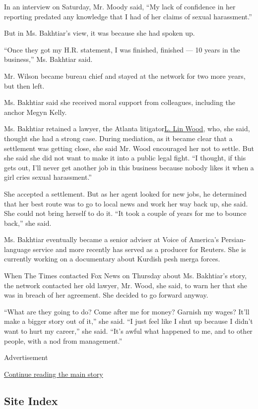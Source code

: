 In an interview on Saturday, Mr. Moody said, ``My lack of confidence in
her reporting predated any knowledge that I had of her claims of sexual
harassment.''

But in Ms. Bakhtiar's view, it was because she had spoken up.

``Once they got my H.R. statement, I was finished, finished --- 10 years
in the business,'' Ms. Bakhtiar said.

Mr. Wilson became bureau chief and stayed at the network for two more
years, but then left.

Ms. Bakhtiar said she received moral support from colleagues, including
the anchor Megyn Kelly.

Ms. Bakhtiar retained a lawyer, the Atlanta
litigator\href{http://www.linwoodlaw.com/attorney/l-lin-wood/}{L. Lin
Wood}, who, she said, thought she had a strong case. During mediation,
as it became clear that a settlement was getting close, she said Mr.
Wood encouraged her not to settle. But she said she did not want to make
it into a public legal fight. ``I thought, if this gets out, I'll never
get another job in this business because nobody likes it when a girl
cries sexual harassment.''

She accepted a settlement. But as her agent looked for new jobs, he
determined that her best route was to go to local news and work her way
back up, she said. She could not bring herself to do it. ``It took a
couple of years for me to bounce back,'' she said.

Ms. Bakhtiar eventually became a senior adviser at Voice of America's
Persian-language service and more recently has served as a producer for
Reuters. She is currently working on a documentary about Kurdish pesh
merga forces.

When The Times contacted Fox News on Thursday about Ms. Bakhtiar's
story, the network contacted her old lawyer, Mr. Wood, she said, to warn
her that she was in breach of her agreement. She decided to go forward
anyway.

``What are they going to do? Come after me for money? Garnish my wages?
It'll make a bigger story out of it,'' she said. ``I just feel like I
shut up because I didn't want to hurt my career,'' she said. ``It's
awful what happened to me, and to other people, with a nod from
management.''

Advertisement

\protect\hyperlink{after-bottom}{Continue reading the main story}

\hypertarget{site-index}{%
\subsection{Site Index}\label{site-index}}

